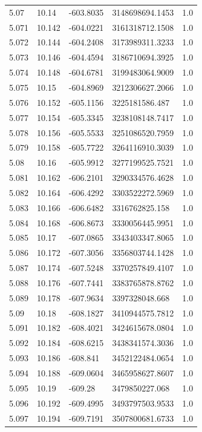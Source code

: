 \begin{tabular}{lllll}
5.07 & 10.14 & -603.8035 & 3148698694.1453 & 1.0 \\
5.071 & 10.142 & -604.0221 & 3161318712.1508 & 1.0 \\
5.072 & 10.144 & -604.2408 & 3173989311.3233 & 1.0 \\
5.073 & 10.146 & -604.4594 & 3186710694.3925 & 1.0 \\
5.074 & 10.148 & -604.6781 & 3199483064.9009 & 1.0 \\
5.075 & 10.15 & -604.8969 & 3212306627.2066 & 1.0 \\
5.076 & 10.152 & -605.1156 & 3225181586.487 & 1.0 \\
5.077 & 10.154 & -605.3345 & 3238108148.7417 & 1.0 \\
5.078 & 10.156 & -605.5533 & 3251086520.7959 & 1.0 \\
5.079 & 10.158 & -605.7722 & 3264116910.3039 & 1.0 \\
5.08 & 10.16 & -605.9912 & 3277199525.7521 & 1.0 \\
5.081 & 10.162 & -606.2101 & 3290334576.4628 & 1.0 \\
5.082 & 10.164 & -606.4292 & 3303522272.5969 & 1.0 \\
5.083 & 10.166 & -606.6482 & 3316762825.158 & 1.0 \\
5.084 & 10.168 & -606.8673 & 3330056445.9951 & 1.0 \\
5.085 & 10.17 & -607.0865 & 3343403347.8065 & 1.0 \\
5.086 & 10.172 & -607.3056 & 3356803744.1428 & 1.0 \\
5.087 & 10.174 & -607.5248 & 3370257849.4107 & 1.0 \\
5.088 & 10.176 & -607.7441 & 3383765878.8762 & 1.0 \\
5.089 & 10.178 & -607.9634 & 3397328048.668 & 1.0 \\
5.09 & 10.18 & -608.1827 & 3410944575.7812 & 1.0 \\
5.091 & 10.182 & -608.4021 & 3424615678.0804 & 1.0 \\
5.092 & 10.184 & -608.6215 & 3438341574.3036 & 1.0 \\
5.093 & 10.186 & -608.841 & 3452122484.0654 & 1.0 \\
5.094 & 10.188 & -609.0604 & 3465958627.8607 & 1.0 \\
5.095 & 10.19 & -609.28 & 3479850227.068 & 1.0 \\
5.096 & 10.192 & -609.4995 & 3493797503.9533 & 1.0 \\
5.097 & 10.194 & -609.7191 & 3507800681.6733 & 1.0 \\

\end{tabular}
